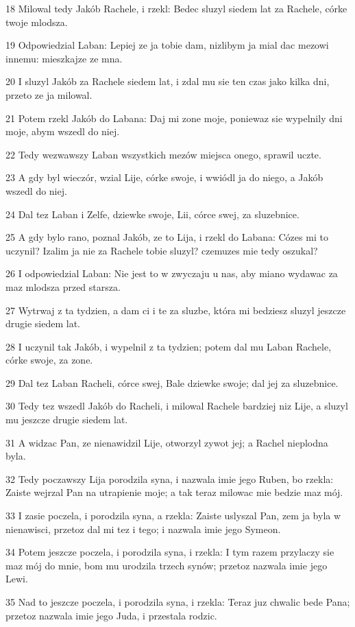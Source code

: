 \par 18 Milowal tedy Jakób Rachele, i rzekl: Bedec sluzyl siedem lat za Rachele, córke twoje mlodsza.
\par 19 Odpowiedzial Laban: Lepiej ze ja tobie dam, nizlibym ja mial dac mezowi innemu: mieszkajze ze mna.
\par 20 I sluzyl Jakób za Rachele siedem lat, i zdal mu sie ten czas jako kilka dni, przeto ze ja milowal.
\par 21 Potem rzekl Jakób do Labana: Daj mi zone moje, poniewaz sie wypelnily dni moje, abym wszedl do niej.
\par 22 Tedy wezwawszy Laban wszystkich mezów miejsca onego, sprawil uczte.
\par 23 A gdy byl wieczór, wzial Lije, córke swoje, i wwiódl ja do niego, a Jakób wszedl do niej.
\par 24 Dal tez Laban i Zelfe, dziewke swoje, Lii, córce swej, za sluzebnice.
\par 25 A gdy bylo rano, poznal Jakób, ze to Lija, i rzekl do Labana: Cózes mi to uczynil? Izalim ja nie za Rachele tobie sluzyl? czemuzes mie tedy oszukal?
\par 26 I odpowiedzial Laban: Nie jest to w zwyczaju u nas, aby miano wydawac za maz mlodsza przed starsza.
\par 27 Wytrwaj z ta tydzien, a dam ci i te za sluzbe, która mi bedziesz sluzyl jeszcze drugie siedem lat.
\par 28 I uczynil tak Jakób, i wypelnil z ta tydzien; potem dal mu Laban Rachele, córke swoje, za zone.
\par 29 Dal tez Laban Racheli, córce swej, Bale dziewke swoje; dal jej za sluzebnice.
\par 30 Tedy tez wszedl Jakób do Racheli, i milowal Rachele bardziej niz Lije, a sluzyl mu jeszcze drugie siedem lat.
\par 31 A widzac Pan, ze nienawidzil Lije, otworzyl zywot jej; a Rachel nieplodna byla.
\par 32 Tedy poczawszy Lija porodzila syna, i nazwala imie jego Ruben, bo rzekla: Zaiste wejrzal Pan na utrapienie moje; a tak teraz milowac mie bedzie maz mój.
\par 33 I zasie poczela, i porodzila syna, a rzekla: Zaiste uslyszal Pan, zem ja byla w nienawisci, przetoz dal mi tez i tego; i nazwala imie jego Symeon.
\par 34 Potem jeszcze poczela, i porodzila syna, i rzekla: I tym razem przylaczy sie maz mój do mnie, bom mu urodzila trzech synów; przetoz nazwala imie jego Lewi.
\par 35 Nad to jeszcze poczela, i porodzila syna, i rzekla: Teraz juz chwalic bede Pana; przetoz nazwala imie jego Juda, i przestala rodzic.

